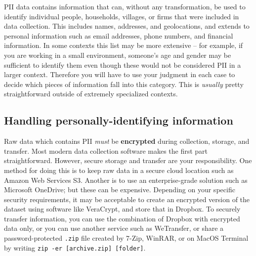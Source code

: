 PII data contains information that can, without any transformation, be used to identify
individual people, households, villages, or firms that were included in data collection.
This includes names, addresses, and geolocations, and extends to personal information
such as email addresses, phone numbers, and financial information.
In some contexts this list may be more extensive --
for example, if you are working in a small environment,
someone's age and gender may be sufficient to identify them
even though these would not be considered PII in a larger context.
Therefore you will have to use your judgment in each case
to decide which pieces of information fall into this category.
This is \textit{usually} pretty straightforward outside of extremely specialized contexts.

\subsection{Handling personally-identifying information}

Raw data which contains PII \textit{must} be \textbf{encrypted}
during collection, storage, and transfer.
Most modern data collection software makes the first part straightforward.
However, secure storage and transfer are your responsibility.
One method for doing this is to keep raw data in a secure cloud location such as Amazon Web Services S3.
Another is to use an enterprise-grade solution such as Microsoft OneDrive; but these can be expensive.
Depending on your specific security requirements,
it may be acceptable to create an encrypted version of the dataset
using software like VeraCrypt, and store that in Dropbox.
To securely transfer information,
you can use the combination of Dropbox with encrypted data only,
or you can use another service such as WeTransfer,
or share a password-protected \texttt{.zip} file created by 7-Zip,
WinRAR,
or on MacOS Terminal by writing \texttt{zip -er [archive.zip] [folder]}.

